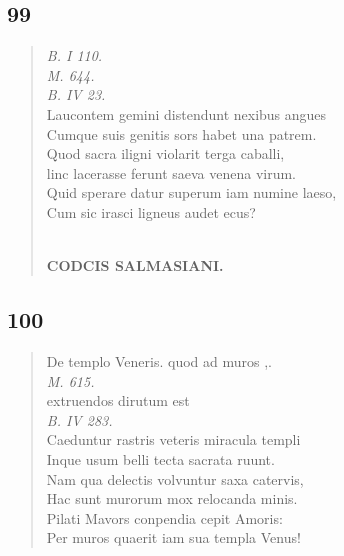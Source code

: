 \documentclass[11pt, a4paper]{report}
\begin{document}
            \subsection*{99}
      \begin{verse}
      \textit{B. I 110.} \\ \textit{M. 644.} \\ \textit{B. IV 23.} \\ Laucontem gemini distendunt nexibus angues \\ Cumque suis genitis sors habet una patrem. \\ Quod sacra iligni violarit terga caballi, \\ linc lacerasse ferunt saeva venena virum. \\ Quid sperare datur superum iam numine laeso, \\ Cum sic irasci ligneus audet ecus? \\ 
        ﻿\pagebreak 
    \begin{center} \textbf{CODCIS SALMASIANI.} \end{center} \marginpar{[0]} 
      \end{verse}
  
            \subsection*{100}
      \begin{verse}
      De templo Veneris. quod ad muros ,. \\ \textit{M. 615.} \\  \lbrack extruendos dirutum est \rbrack  \\ \textit{B. IV 283.} \\ Caeduntur rastris veteris miracula templi \\ Inque usum belli tecta sacrata ruunt. \\ Nam qua delectis volvuntur saxa catervis, \\ Hac sunt murorum mox relocanda minis. \\ Pilati Mavors conpendia cepit Amoris: \\ Per muros quaerit iam sua templa Venus! \\ 
      \end{verse}
  
\end{document}

